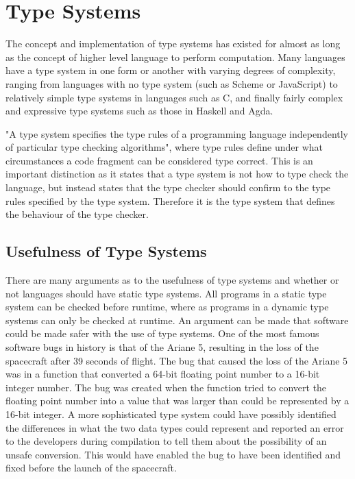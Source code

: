 \section{Type Systems}
The concept and implementation of type systems has existed for almost as long as the concept of higher level language to perform computation\cite{Backus:1978:HFI:960118.808380}.
Many languages have a type system in one form or another with varying degrees of complexity,
ranging from languages with no type system (such as Scheme or JavaScript) to relatively simple type systems in languages such as C, and finally fairly complex and expressive type systems such as those in Haskell and Agda.

"A type system specifies the type rules of a programming language independently of particular type checking algorithms"\cite{cardelli1996type}, where type rules define under what circumstances a code fragment can be considered type correct.
This is an important distinction as it states that a type system is not how to type check the language, but instead states that the type checker should confirm to the type rules specified by the type system.
Therefore it is the type system that defines the behaviour of the type checker.  

\subsection{Usefulness of Type Systems}
There are many arguments as to the usefulness of type systems and whether or not languages should have static type systems.
All programs in a static type system can be checked before runtime, where as programs in a dynamic type systems can only be checked at runtime.
An argument can be made that software could be made safer with the use of type systems.
One of the most famous software bugs in history is that of the Ariane 5, resulting in the loss of the spacecraft after 39 seconds of flight.
The bug that caused the loss of the Ariane 5 was in a function that converted a 64-bit floating point number to a 16-bit integer number.
The bug was created when the function tried to convert the floating point number into a value that was larger than could be represented by a 16-bit integer\cite{lions1996ariane}.
A more sophisticated type system could have possibly identified the differences in what the two data types could represent and reported an error to the developers during compilation to tell them about the possibility of an unsafe conversion.
This would have enabled the bug to have been identified and fixed before the launch of the spacecraft.

